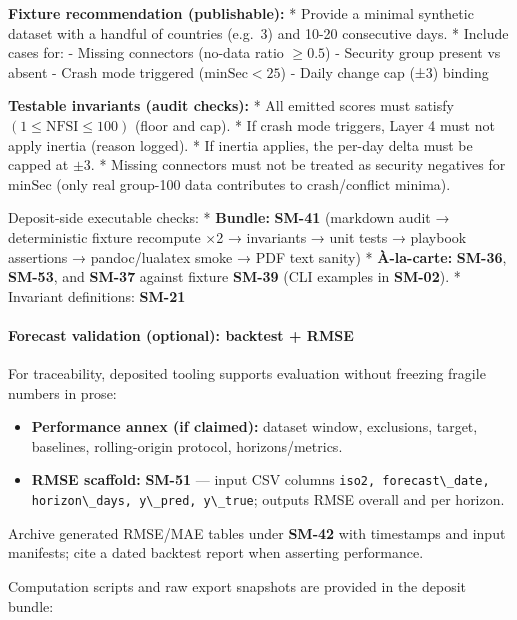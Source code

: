 \documentclass[
  11pt,
  peerreview,journal,onecolumn]{IEEEtran}
\newcommand{\passthrough}[1]{#1}
\providecommand{\tightlist}{%
  \setlength{\itemsep}{0pt}\setlength{\parskip}{0pt}}
\begin{document}
\textbf{Fixture recommendation (publishable):} * Provide a minimal
synthetic dataset with a handful of countries (e.g.~3) and 10-20
consecutive days. * Include cases for: - Missing connectors (no-data
ratio \(\geq 0.5\)) - Security group present vs absent - Crash mode
triggered (\(\mathrm{minSec} < 25\)) - Daily change cap (±3) binding

\textbf{Testable invariants (audit checks):} * All emitted scores must
satisfy \((1 \leq \text{NFSI} \leq 100)\) (floor and cap). * If crash
mode triggers, Layer 4 must not apply inertia (reason logged). * If
inertia applies, the per-day delta must be capped at \(\pm 3\). *
Missing connectors must not be treated as security negatives for
\(\mathrm{minSec}\) (only real group-100 data contributes to
crash/conflict minima).

Deposit-side executable checks: * \textbf{Bundle:} \textbf{SM-41}
(markdown audit → deterministic fixture recompute ×2 → invariants → unit
tests → playbook assertions → pandoc/lualatex smoke → PDF text sanity) *
\textbf{À-la-carte:} \textbf{SM-36}, \textbf{SM-53}, and \textbf{SM-37}
against fixture \textbf{SM-39} (CLI examples in \textbf{SM-02}). *
Invariant definitions: \textbf{SM-21}

\hypertarget{forecast-validation-optional-backtest-rmse}{%
\paragraph{Forecast validation (optional): backtest +
RMSE}\label{forecast-validation-optional-backtest-rmse}}

For traceability, deposited tooling supports evaluation without freezing
fragile numbers in prose:

\begin{itemize}
\tightlist
\item
  \textbf{Performance annex (if claimed):} dataset window, exclusions,
  target, baselines, rolling-origin protocol, horizons/metrics.
\item
  \textbf{RMSE scaffold:} \textbf{SM-51} --- input CSV columns
  \passthrough{\lstinline!iso2, forecast\_date, horizon\_days, y\_pred, y\_true!};
  outputs RMSE overall and per horizon.
\end{itemize}

Archive generated RMSE/MAE tables under \textbf{SM-42} with timestamps
and input manifests; cite a dated backtest report when asserting
performance.

Computation scripts and raw export snapshots are provided in the deposit
bundle:
\end{document}
